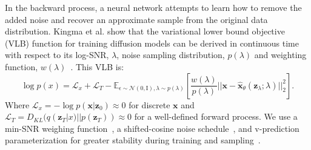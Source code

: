 In the backward process, a neural network attempts to learn how to remove the added noise and recover an approximate sample from the original data distribution. Kingma et al. show that the variational lower bound objective (VLB) function for training diffusion models can be derived in continuous time with respect to its log-SNR, $\lambda$, noise sampling distribution, $p(\lambda)$ and weighting function, $w(\lambda)$~\cite{kingma2023variationaldiffusionmodels}. This VLB is:
\begin{equation}
    \log p(x) = \mathcal{L}_x + \mathcal{L}_T - \mathbb{E}_{\epsilon \sim \mathcal{N}(0,\text{I}), \lambda \sim p(\lambda)} \left[ \frac{w(\lambda)}{p(\lambda)} ||\bm{x} - \hat{\bm{x}}_\theta(\bm{z}_\lambda; \lambda)||_2^2 \right]. \label{eq:ELBO}
\end{equation}
Where $\mathcal{L}_x=-\log p(\bm{x}|\bm{z}_0) \approx 0$ for discrete $\bm{x}$ and $\mathcal{L}_T=D_{KL}(q(\bm{z}_T|x)||p(\bm{z}_T)) \approx 0$ for a well-defined forward process. We use a min-SNR weighing function~\cite{hang2024efficientdiffusiontrainingminsnr}, a shifted-cosine noise schedule~\cite{Hoogeboom:arXiv:2023:simpleDiffusion}, and v-prediction parameterization for greater stability during training and sampling~\cite{salimans2022progressivedistillationfastsampling}.


\begin{comment}
Commonly, a large, pre-trained variational autoencoder (VAE) is used to reduce the dimensionality of images~\cite{rombach2022highresolutionimagesynthesislatent}. However, outside of natural images, the scale of data required to train a VAE for a specific use case is not always available.
\end{comment}

\begin{comment}
Various approaches can be made to reduce the computational burden of high resolution feature maps while training diffusion models. Discrete wavelet transforms (DWTs)~\cite{grgic1999imagecompression} offer a lossless alternative to VAEs for image compression by decomposing an image into its frequency responses, which naturally have dimensions 1/2 the size and a channel count 4x the size, per level of decomposition. Modern accelerators offset the cost of scaling the number of channels, while the dimension reduction provides ample relief in memory burden.
\end{comment}

